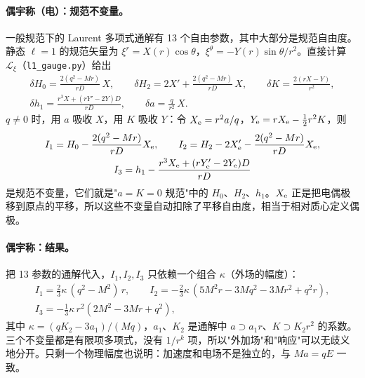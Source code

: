 \documentclass[11pt,a4paper]{ctexart}
\numberwithin{equation}{section}
\begin{document}
\paragraph{偶宇称（电）：规范不变量。}一般规范下的 Laurent 多项式通解有 13 个自由参数，其中大部分是规范自由度。静态 $\ell=1$ 的规范矢量为 $\xi^r=X(r)\cos\theta$，$\xi^\theta=-Y(r)\sin\theta/r^2$。直接计算 $\mathcal L_\xi$（\texttt{l1\_gauge.py}）给出
\begin{gather*}
\delta H_0=\frac{2(q^2-Mr)}{rD}\,X,\qquad
\delta H_2=2X'+\frac{2(q^2-Mr)}{rD}\,X,\qquad
\delta K=\frac{2(rX-Y)}{r^2},\\
\delta h_1=\frac{r^3X+(rY'-2Y)D}{rD},\qquad
\delta a=\frac{q}{r^2}\,X .
\end{gather*}
$q\neq0$ 时，用 $a$ 吸收 $X$，用 $K$ 吸收 $Y$：令 $X_{\rm e}=r^2a/q$，$Y_{\rm e}=rX_{\rm e}-\tfrac12r^2K$，则
\begin{gather*}
I_1=H_0-\frac{2(q^2-Mr)}{rD}X_{\rm e},\qquad
I_2=H_2-2X_{\rm e}'-\frac{2(q^2-Mr)}{rD}X_{\rm e},\\
I_3=h_1-\frac{r^3X_{\rm e}+(rY_{\rm e}'-2Y_{\rm e})D}{rD}
\end{gather*}
是规范不变量，它们就是"$a=K=0$ 规范"中的 $H_0$、$H_2$、$h_1$。$X_{\rm e}$ 正是把电偶极移到原点的平移，所以这些不变量自动扣除了平移自由度，相当于相对质心定义偶极。

\paragraph{偶宇称：结果。}把 13 参数的通解代入，$I_1,I_2,I_3$ 只依赖一个组合 $\kappa$（外场的幅度）：
\begin{gather*}
I_1=\tfrac23\kappa\,(q^2-M^2)\,r,\qquad
I_2=-\tfrac23\kappa\,(5M^2r-3Mq^2-3Mr^2+q^2r),\\
I_3=-\tfrac13\kappa\,r^2(2M^2-3Mr+q^2),
\end{gather*}
其中 $\kappa=(qK_2-3a_1)/(Mq)$，$a_1$、$K_2$ 是通解中 $a\supset a_1r$、$K\supset K_2r^2$ 的系数。三个不变量都是有限项多项式，没有 $1/r^k$ 项，所以"外加场"和"响应"可以无歧义地分开。只剩一个物理幅度也说明：加速度和电场不是独立的，与 $Ma=qE$ 一致。
\end{document}
